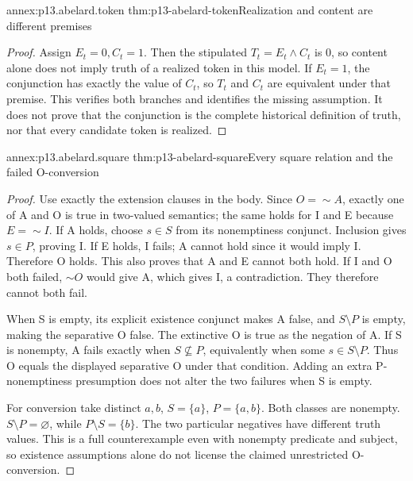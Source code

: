 \begin{annexitem}{annex:p13.abelard.token}
 {thm:p13-abelard-token}{Realization and content are different premises}
\begin{proof}
Assign \(E_t=0,C_t=1\). Then the stipulated
\(T_t=E_t\land C_t\) is 0, so content alone does not imply truth
of a realized token in this model.
If \(E_t=1\), the conjunction has exactly the value of \(C_t\),
so \(T_t\) and \(C_t\) are equivalent under that premise.
This verifies both branches and identifies the missing assumption.
It does not prove that the conjunction is the complete historical
definition of truth, nor that every candidate token is realized.
\end{proof}
\end{annexitem}

\begin{annexitem}{annex:p13.abelard.square}
 {thm:p13-abelard-square}{Every square relation and the failed O-conversion}
\begin{proof}
Use exactly the extension clauses in the body. Since \(O=\sim A\),
exactly one of A and O is true in two-valued semantics; the same
holds for I and E because \(E=\sim I\).
If A holds, choose \(s\in S\) from its nonemptiness conjunct.
Inclusion gives \(s\in P\), proving I.
If E holds, I fails; A cannot hold since it would imply I.
Therefore O holds. This also proves that A and E cannot both hold.
If I and O both failed, \(\sim O\) would give A, which gives I,
a contradiction. They therefore cannot both fail.

When S is empty, its explicit existence conjunct makes A false,
and \(S\setminus P\) is empty, making the separative O false.
The extinctive O is true as the negation of A.
If S is nonempty, A fails exactly when \(S\not\subseteq P\),
equivalently when some \(s\in S\setminus P\).
Thus O equals the displayed separative O under that condition.
Adding an extra P-nonemptiness presumption does not alter
the two failures when S is empty.

For conversion take distinct \(a,b\), \(S=\{a\}\), \(P=\{a,b\}\).
Both classes are nonempty. \(S\setminus P=\varnothing\),
while \(P\setminus S=\{b\}\).
The two particular negatives have different truth values.
This is a full counterexample even with nonempty predicate
and subject, so existence assumptions alone do not license
the claimed unrestricted O-conversion.
\end{proof}
\end{annexitem}

